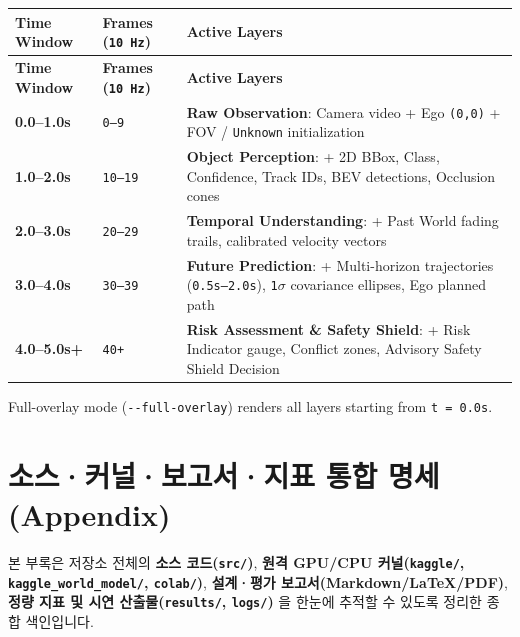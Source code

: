 \documentclass[10.5pt,a4paper]{article}
\begin{document}
\begin{footnotesize}
\setlength{\tabcolsep}{4pt}
\setlength{\LTleft}{0pt}\setlength{\LTright}{0pt}
\begin{longtable}{>{\raggedright\arraybackslash}p{} >{\raggedright\arraybackslash}p{} >{\raggedright\arraybackslash}p{}}
\toprule
\textbf{Time Window} & \textbf{Frames (\texttt{10 Hz})} & \textbf{Active Layers} \\
\midrule
\endfirsthead
\toprule
\textbf{Time Window} & \textbf{Frames (\texttt{10 Hz})} & \textbf{Active Layers} \\
\midrule
\endhead
\bottomrule
\endfoot
\textbf{0.0--1.0s} & \texttt{0--9} & \textbf{Raw Observation}: Camera video + Ego \texttt{(0,\allowbreak{}0)} + FOV / \texttt{Unknown} initialization \\
\textbf{1.0--2.0s} & \texttt{10--19} & \textbf{Object Perception}: + 2D BBox, Class, Confidence, Track IDs, BEV detections, Occlusion cones \\
\textbf{2.0--3.0s} & \texttt{20--29} & \textbf{Temporal Understanding}: + Past World fading trails, calibrated velocity vectors \\
\textbf{3.0--4.0s} & \texttt{30--39} & \textbf{Future Prediction}: + Multi-horizon trajectories (\texttt{0.\allowbreak{}5s--2.\allowbreak{}0s}), \texttt{1$\sigma$} covariance ellipses, Ego planned path \\
\textbf{4.0--5.0s+} & \texttt{40+} & \textbf{Risk Assessment \& Safety Shield}: + Risk Indicator gauge, Conflict zones, Advisory Safety Shield Decision \\
\end{longtable}
\end{footnotesize}


Full-overlay mode (\texttt{-\allowbreak{}-\allowbreak{}full-\allowbreak{}overlay}) renders all layers starting from \texttt{t = 0.\allowbreak{}0s}.

\newpage
\section{소스·커널·보고서·지표 통합 명세 (Appendix)}

본 부록은 저장소 전체의 \textbf{소스 코드(\texttt{src/\allowbreak{}})}, \textbf{원격 GPU/CPU 커널(\texttt{kaggle/\allowbreak{}}, \texttt{kaggle\_\allowbreak{}world\_\allowbreak{}model/\allowbreak{}}, \texttt{colab/\allowbreak{}})}, \textbf{설계·평가 보고서(Markdown/LaTeX/PDF)}, \textbf{정량 지표 및 시연 산출물(\texttt{results/\allowbreak{}}, \texttt{logs/\allowbreak{}})} 을 한눈에 추적할 수 있도록 정리한 종합 색인입니다.
\end{document}
